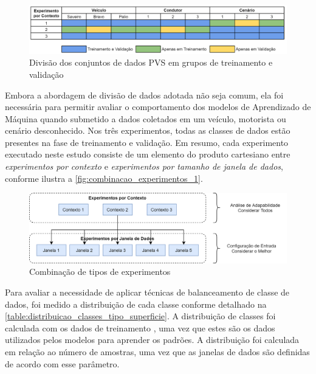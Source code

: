 \begin{figure}[h]
  \centering
  \caption{Divisão dos conjuntos de dados PVS em grupos de treinamento e validação}
  \label{fig:divisao_conjuntos_pvs}
  \includegraphics[width=1\textwidth]{figuras/fig_29.png}
\end{figure}

Embora a abordagem de divisão de dados adotada não seja comum, ela foi necessária para permitir avaliar o comportamento dos modelos de Aprendizado de Máquina quando submetido a dados coletados em um veículo, motorista ou cenário desconhecido. Nos três experimentos, todas as classes de dados estão presentes na fase de treinamento e validação. Em resumo, cada experimento executado neste estudo consiste de um elemento do produto cartesiano entre \emph{experimentos por contexto} e \emph{experimentos por tamanho de janela de dados}, conforme ilustra a \autoref{fig:combinacao_experimentos_1}.

\begin{figure}[h]
  \centering
  \caption{Combinação de tipos de experimentos}
  \label{fig:combinacao_experimentos_1}
  \includegraphics[width=1\textwidth]{figuras/fig_29_1.png}
\end{figure}

Para avaliar a necessidade de aplicar técnicas de balanceamento de classe de dados, foi medido a distribuição de cada classe conforme detalhado na \autoref{table:distribuicao_classes_tipo_superficie}. A distribuição de classes foi calculada com os dados de treinamento \cite{He2013,Kuhn2013}, uma vez que estes são os dados utilizados pelos modelos para aprender os padrões. A distribuição foi calculada em relação ao número de amostras, uma vez que as janelas de dados são definidas de acordo com esse parâmetro.

